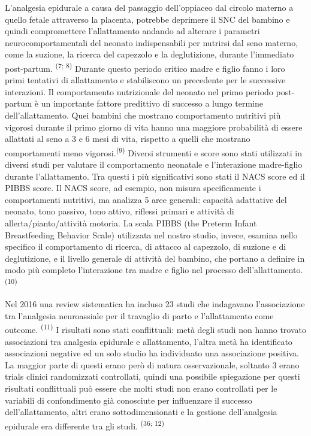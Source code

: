 \documentclass[]{article}
\begin{document}
L'analgesia epidurale a causa del passaggio dell'oppiaceo dal circolo
materno a quello fetale attraverso la placenta, potrebbe deprimere il
SNC del bambino e quindi compromettere l'allattamento andando ad
alterare i parametri neurocomportamentali del neonato indispensabili per
nutrirsi dal seno materno, come la suzione, la ricerca del capezzolo e
la deglutizione, durante l'immediato post-partum. \textsuperscript{(7;
8)} Durante questo periodo critico madre e figlio fanno i loro primi
tentativi di allattamento e stabiliscono un precedente per le successive
interazioni. Il comportamento nutrizionale del neonato nel primo periodo
post-partum è un importante fattore predittivo di successo a lungo
termine dell'allattamento. Quei bambini che mostrano comportamento
nutritivi più vigorosi durante il primo giorno di vita hanno una
maggiore probabilità di essere allattati al seno a 3 e 6 mesi di vita,
rispetto a quelli che mostrano comportamenti meno
vigorosi.\textsuperscript{(9)} Diversi strumenti e score sono stati
utilizzati in diversi studi per valutare il comportamento neonatale e
l'interazione madre-figlio durante l'allattamento. Tra questi i più
significativi sono stati il NACS score ed il PIBBS score. Il NACS score,
ad esempio, non misura specificamente i comportamenti nutritivi, ma
analizza 5 aree generali: capacità adattative del neonato, tono passivo,
tono attivo, riflessi primari e attività di allerta/pianto/attività
motoria. La scala PIBBS (the Preterm Infant Breastfeeding Behavior
Scale) utilizzata nel nostro studio, invece, esamina nello specifico il
comportamento di ricerca, di attacco al capezzolo, di suzione e di
deglutizione, e il livello generale di attività del bambino, che portano
a definire in modo più completo l'interazione tra madre e figlio nel
processo dell'allattamento. \textsuperscript{(10)}

Nel 2016 una review sistematica ha incluso 23 studi che indagavano
l'associazione tra l'analgesia neuroassiale per il travaglio di parto e
l'allattamento come outcome. \textsuperscript{(11)} I risultati sono
stati conflittuali: metà degli studi non hanno trovato associazioni tra
analgesia epidurale e allattamento, l'altra metà ha identificato
associazioni negative ed un solo studio ha individuato una associazione
positiva. La maggior parte di questi erano però di natura
osservazionale, soltanto 3 erano trials clinici randomizzati
controllati, quindi una possibile spiegazione per questi risultati
conflittuali può essere che molti studi non erano controllati per le
variabili di confondimento già conosciute per influenzare il successo
dell'allattamento, altri erano sottodimensionati e la gestione
dell'analgesia epidurale era differente tra gli studi.
\textsuperscript{(36; 12)}
\end{document}
